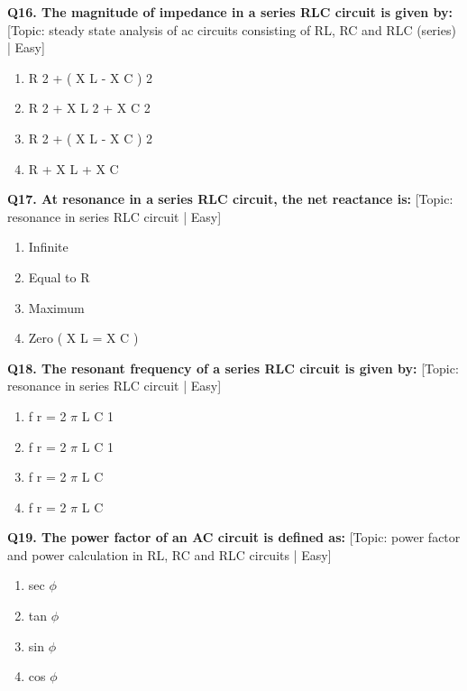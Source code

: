 \noindent\textbf{Q16. The magnitude of impedance in a series RLC circuit is given by:} \hfill [Topic: steady state analysis of ac circuits consisting of RL, RC and RLC (series) | Easy]
\begin{enumerate}[label=(\alph*),topsep=2pt,itemsep=1pt,partopsep=0pt,parsep=0pt]
    \item {R 2 + ( X L - X C ) 2}
    \item {R 2 + X L 2 + X C 2}
    \item {R 2 + ( X L - X C ) 2}
    \item {R + X L + X C}
\end{enumerate}
\vspace{2mm}

\noindent\textbf{Q17. At resonance in a series RLC circuit, the net reactance is:} \hfill [Topic: resonance in series RLC circuit | Easy]
\begin{enumerate}[label=(\alph*),topsep=2pt,itemsep=1pt,partopsep=0pt,parsep=0pt]
    \item {Infinite}
    \item {Equal to R}
    \item {Maximum}
    \item {Zero ( X L = X C )}
\end{enumerate}
\vspace{2mm}

\noindent\textbf{Q18. The resonant frequency of a series RLC circuit is given by:} \hfill [Topic: resonance in series RLC circuit | Easy]
\begin{enumerate}[label=(\alph*),topsep=2pt,itemsep=1pt,partopsep=0pt,parsep=0pt]
    \item {f r = 2 $\pi$ L C 1}
    \item {f r = 2 $\pi$ L C 1}
    \item {f r = 2 $\pi$ L C}
    \item {f r = 2 $\pi$ L C}
\end{enumerate}
\vspace{2mm}

\noindent\textbf{Q19. The power factor of an AC circuit is defined as:} \hfill [Topic: power factor and power calculation in RL, RC and RLC circuits | Easy]
\begin{enumerate}[label=(\alph*),topsep=2pt,itemsep=1pt,partopsep=0pt,parsep=0pt]
    \item {sec $\phi$}
    \item {tan $\phi$}
    \item {sin $\phi$}
    \item {cos $\phi$}
\end{enumerate}
\vspace{2mm}

